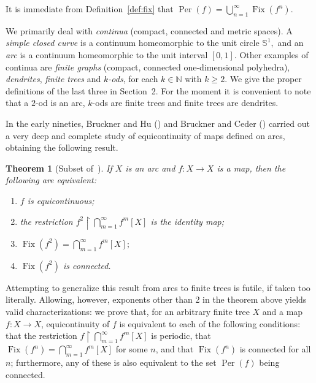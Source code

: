 \documentclass[12pt]{amsart}
\newtheorem{theorem}{Theorem}[section]
\theoremstyle{definition}
\numberwithin{equation}{section}
\DeclareMathOperator{\fix}{Fix}
\DeclareMathOperator{\per}{Per}
\begin{document}
It is immediate from Definition~\ref{def:fix} that $\per(f)=\bigcup_{n=1}^\infty\fix(f^n)$.

We primarily deal with {\em continua} (compact, connected and metric spaces). A {\em simple closed curve} is a continuum homeomorphic to the unit circle $\mathbb S^1,$ and an {\em arc} is a continuum homeomorphic to the
unit interval $[0,1].$ Other examples of continua are {\em finite graphs} (compact, connected one-dimensional polyhedra),  {\em dendrites}, {\em finite trees} and {\em $k$-ods}, for each $k \in \mathbb N$ with $k \geq 2.$ We give the proper definitions of the last three in Section~2. For the moment it is convenient to note that a $2$-od is an arc,
$k$-ods are finite trees and finite trees are dendrites.

In the early nineties, Bruckner and Hu (\cite{bruckner-hu}) and Bruckner and Ceder (\cite{bruckner-ceder}) carried 
out a very deep and complete study of equicontinuity of maps defined on arcs, obtaining the following result.

\begin{theorem}[Subset of~{\cite[Theorem 1.2]{bruckner-ceder}}]\label{thm:bruck-ced}
If $X$ is an arc and $f \colon X\longrightarrow X$ is a map, then the following are equivalent:
\begin{enumerate}
\item[\emph{(1)}] $f$ is equicontinuous;
\item[\emph{(2)}]  the restriction $f^2\upharpoonright\bigcap_{m=1}^\infty f^m[X]$ is the identity map;
\item[\emph{(3)}]  $\fix(f^2)=\bigcap_{m=1}^\infty f^m[X];$
\item[\emph{(4)}]  $\fix(f^2)$ is connected.
\end{enumerate}
\end{theorem}

Attempting to generalize this result from arcs to finite trees is futile, if taken too literally. Allowing, however, exponents other than 2 in the theorem above yields valid characterizations: we prove that, for an arbitrary finite tree $X$ and a map $f \colon X\longrightarrow X$, equicontinuity of $f$ is equivalent to each of the following conditions: that the restriction $f\upharpoonright\bigcap_{m=1}^\infty f^m[X]$ is periodic, that 
$\fix(f^n)=\bigcap_{m=1}^\infty f^m[X]$ for some $n$, and that $\fix(f^n)$ is connected for all $n$; furthermore, any of these is also equivalent to the set $\per(f)$ being connected.
\end{document}
